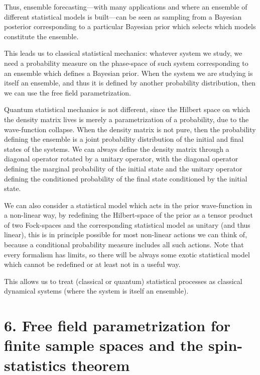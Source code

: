 \documentclass[11pt]{book}
\begin{document}
Thus, ensemble forecasting\cite{wu2021theory}---with many applications and where an ensemble of different
statistical models is built---can be seen as sampling from a Bayesian
posterior corresponding to a particular Bayesian prior which selects
which models constitute the ensemble.

This leads us to classical statistical mechanics: whatever system we
study, we need a probability measure on the phase-space of such system
corresponding to an ensemble which defines a Bayesian prior. When the
system we are studying is itself an ensemble, and thus it is defined by
another probability distribution, then we can use the free field
parametrization.

Quantum statistical mechanics is not different, since the Hilbert space
on which the density matrix lives is merely a parametrization of a
probability, due to the wave-function collapse. When the density matrix
is not pure, then the probability defining the ensemble is a joint
probability distribution of the initial and final states of the systems.
We can always define the density matrix through a diagonal operator
rotated by a unitary operator, with the diagonal operator defining the
marginal probability of the initial state and the unitary operator
defining the conditioned probability of the final state conditioned by
the initial state.

We can also consider a statistical model which acts in the prior
wave-function in a non-linear way, by redefining the Hilbert-space of
the prior as a tensor product of two Fock-spaces and the corresponding
statistical model as unitary (and thus linear), this is in principle
possible for most non-linear actions we can think of, because a
conditional probability measure includes all such actions. Note that
every formalism has limits, so there will be always some exotic
statistical model which cannot be redefined or at least not in a useful
way.

This allows us to treat (classical or quantum) statistical processes as
classical dynamical systems (where the system is itself an ensemble).

\hypertarget{free-field-parametrization-for-finite-sample-spaces-and-the-spin-statistics-theorem}{%
\section{6. Free field parametrization for finite sample spaces and the
spin-statistics
theorem}\label{free-field-parametrization-for-finite-sample-spaces-and-the-spin-statistics-theorem}}
\end{document}
